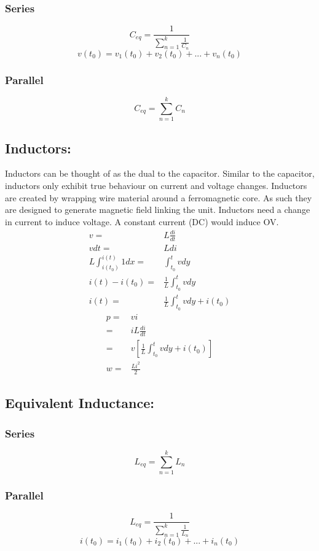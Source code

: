 \documentclass[a5paper]{article}
\begin{document}
	\subsubsection{Series}
	$$C_{eq}=\frac{1}{\sum^{k}_{n=1}\frac{1}{C_{n}}}$$
	$$v(t_{0})=v_{1}(t_{0})+v_{2}(t_{0})+...+v_{n}(t_{0})$$
	\subsubsection{Parallel}
	$$C_{eq}=\sum^{k}_{n=1}C_{n}$$
	\subsection{Inductors:}
	Inductors can be thought of as the dual to the capacitor. Similar to the capacitor, inductors only exhibit true behaviour on current and voltage changes. Inductors are created by wrapping wire material around a ferromagnetic core. As such they are designed to generate magnetic field linking the unit. Inductors need a change in current to induce voltage. A constant current (DC) would induce OV.
	\begin{align*}
		v=&L\frac{di}{dt}\\
		vdt=&Ldi\\
		L\int^{i(t)}_{i(t_{0})}1dx=&\int^{t}_{t_{0}}vdy\\
		i(t)-i(t_{0})=&\frac{1}{L}\int^{t}_{t_{0}}vdy\\
		i(t)=&\frac{1}{L}\int^{t}_{t_{0}}vdy+i(t_{0})
	\end{align*}
	\begin{align*}
		p=&vi\\
		=&iL\frac{di}{dt}\\
		=&v[\frac{1}{L}\int^{t}_{t_{0}}vdy+i(t_{0})]\\
		w=&\frac{Li^{2}}{2}
	\end{align*}
	\subsection{Equivalent Inductance:}
	\subsubsection{Series}
	$$L_{eq}=\sum^{k}_{n=1}L_{n}$$
	\subsubsection{Parallel}
	$$L_{eq}=\frac{1}{\sum^{k}_{n=1}\frac{1}{L_{n}}}$$
	$$i(t_{0})=i_{1}(t_{0})+i_{2}(t_{0})+...+i_{n}(t_{0})$$
\end{document}

